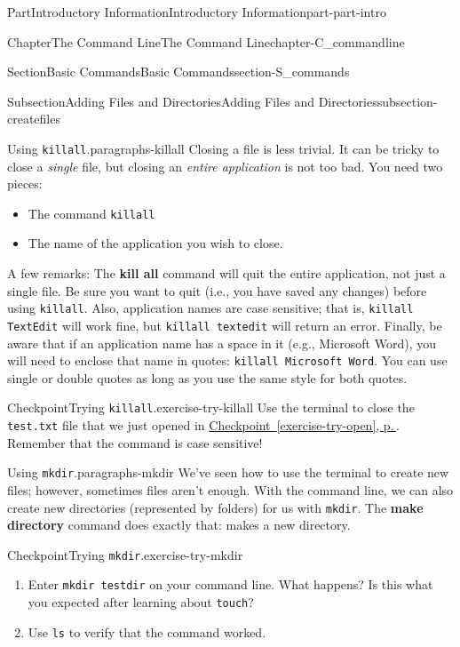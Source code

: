 \documentclass[twoside,10pt,]{book}
\newcommand{\xreffont}{\relax}
\newcommand{\mono}[1]{\texttt{#1}}
\newcommand{\terminology}[1]{\textbf{#1}}
\begin{document}
\begin{partptx}{Part}{Introductory Information}{}{Introductory Information}{}{}{part-part-intro}
\begin{chapterptx}{Chapter}{The Command Line}{}{The Command Line}{}{}{chapter-C_commandline}
\begin{sectionptx}{Section}{Basic Commands}{}{Basic Commands}{}{}{section-S_commands}
\begin{subsectionptx}{Subsection}{Adding Files and Directories}{}{Adding Files and Directories}{}{}{subsection-createfiles}
\begin{paragraphs}{Using \mono{killall}.}{paragraphs-killall}
Closing a file is less trivial. It can be tricky to close a \emph{single} file, but closing an \emph{entire application} is not too bad. You need two pieces:%
\begin{itemize}[label=\textbullet]
\item{}The command \mono{killall}%
\item{}The name of the application you wish to close.%
\end{itemize}
A few remarks: The \terminology{kill all} command will quit the entire application, not just a single file. Be sure you want to quit (i.e., you have saved any changes) before using \mono{killall}. Also, application names are case sensitive; that is, \mono{killall TextEdit} will work fine, but \mono{killall textedit} will return an error. Finally, be aware that if an application name has a space in it (e.g.\@, Microsoft Word), you will need to enclose that name in quotes: \mono{killall \textquotesingle{}Microsoft Word\textquotesingle{}}. You can use single or double quotes as long as you use the same style for both quotes.%
\begin{inlineexercise}{Checkpoint}{Trying \mono{killall}.}{exercise-try-killall}%
Use the terminal to close the \mono{test.txt} file that we just opened in \hyperref[exercise-try-open]{Checkpoint~{\xreffont\ref{exercise-try-open}}, p.\,\pageref{exercise-try-open}}. Remember that the command is case sensitive!%
\end{inlineexercise}%
\end{paragraphs}%
\begin{paragraphs}{Using \mono{mkdir}.}{paragraphs-mkdir}%
\index{\mono{mkdir}}%
%
\index{command line!\mono{mkdir}}%
We've seen how to use the terminal to create new files; however, sometimes files aren't enough. With the command line, we can also create new directories (represented by folders) for us with \mono{mkdir}. The \terminology{make directory} command does exactly that: makes a new directory.%
\begin{inlineexercise}{Checkpoint}{Trying \mono{mkdir}.}{exercise-try-mkdir}%
\begin{enumerate}[font=\bfseries,label=(\alph*),ref=\alph*]%
\item{}Enter \mono{mkdir testdir} on your command line. What happens? Is this what you expected after learning about \mono{touch}?%
\item{}Use \mono{ls} to verify that the command worked.%
\end{enumerate}%
\end{inlineexercise}%

\end{paragraphs}
\end{subsectionptx}
\end{sectionptx}
\end{chapterptx}
\end{partptx}
\end{document}
